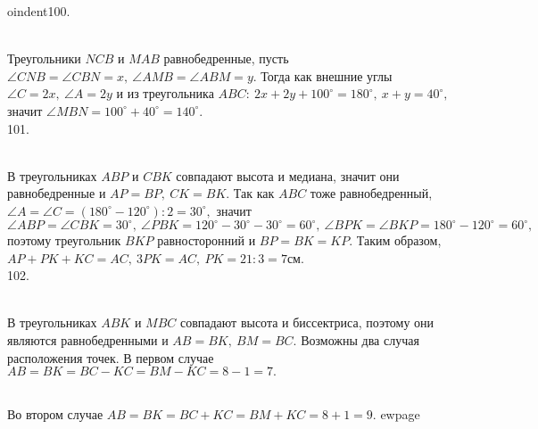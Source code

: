 oindent100. \begin{figure}[ht!]
\end{figure}\\
Треугольники $NCB$ и $MAB$ равнобедренные, пусть $\angle CNB=\angle CBN=x,\ \angle AMB=\angle ABM=y.$ Тогда как внешние углы $\angle C=2x,\ \angle A=2y$ и из треугольника $ABC:\ 2x+2y+100^\circ=180^\circ,\ x+y=40^\circ,$ значит $\angle MBN=100^\circ+40^\circ=140^\circ.$\\
101. \begin{figure}[ht!]
\end{figure}\\
В треугольниках $ABP$ и $CBK$ совпадают высота и медиана, значит они равнобедренные и $AP=BP,\ CK=BK.$ Так как $ABC$ тоже равнобедренный, $\angle A=\angle C=(180^\circ-120^\circ):2=30^\circ,$ значит $\angle ABP=\angle CBK=30^\circ,\ \angle PBK=120^\circ-30^\circ-30^\circ=60^\circ,\ \angle BPK=\angle BKP=180^\circ-120^\circ=60^\circ,$ поэтому треугольник $BKP$ равносторонний и $BP=BK=KP.$ Таким образом, $AP+PK+KC=AC,\ 3PK=AC,\ PK=21:3=7$см.\\
102. \begin{figure}[ht!]
\end{figure}\\
В треугольниках $ABK$ и $MBC$ совпадают высота и биссектриса, поэтому они являются равнобедренными и $AB=BK,\ BM=BC.$ Возможны два случая расположения точек. В первом случае $AB=BK=BC-KC=BM-KC=8-1=7.$
 \begin{figure}[ht!]
\end{figure}\\
Во втором случае $AB=BK=BC+KC=BM+KC=8+1=9.$
ewpage

